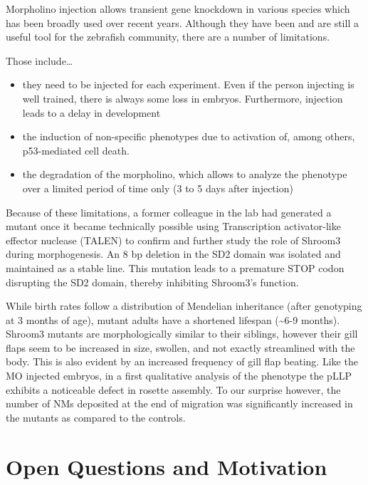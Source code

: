 \documentclass[11pt,singlespacinge,twoside]{reedthesis} %
\providecommand{\tightlist}{%
  \setlength{\itemsep}{0pt}\setlength{\parskip}{0pt}}
\theoremstyle{definition}
\theoremstyle{definition}
\theoremstyle{definition}
\theoremstyle{remark}
\begin{document}
Morpholino injection allows transient gene knockdown in various species which has been broadly used over recent years. Although they have been and are still a useful tool for the zebrafish community, there are a number of limitations.

Those include\ldots{}
\begin{itemize}
\tightlist
\item
  they need to be injected for each experiment. Even if the person injecting is well trained, there is always some loss in embryos. Furthermore, injection leads to a delay in development
\item
  the induction of non-specific phenotypes due to activation of, among others, p53-mediated cell death.
\item
  the degradation of the morpholino, which allows to analyze the phenotype over a limited period of time only (3 to 5 days after injection)
\end{itemize}
Because of these limitations, a former colleague in the lab had generated a mutant once it became technically possible using Transcription activator-like effector nuclease (TALEN) to confirm and further study the role of Shroom3 during morphogenesis. An 8 bp deletion in the SD2 domain was isolated and maintained as a stable line. This mutation leads to a premature STOP codon disrupting the SD2 domain, thereby inhibiting Shroom3's function.

While birth rates follow a distribution of Mendelian inheritance (after genotyping at 3 months of age), mutant adults have a shortened lifespan (\textasciitilde6-9 months). Shroom3 mutants are morphologically similar to their siblings, however their gill flaps seem to be increased in size, swollen, and not exactly streamlined with the body. This is also evident by an increased frequency of gill flap beating. Like the MO injected embryos, in a first qualitative analysis of the phenotype the pLLP exhibits a noticeable defect in rosette assembly. To our surprise however, the number of NMs deposited at the end of migration was significantly increased in the mutants as compared to the controls.

\hypertarget{open-questions-and-motivation}{%
\section{Open Questions and Motivation}\label{open-questions-and-motivation}}
\end{document}
